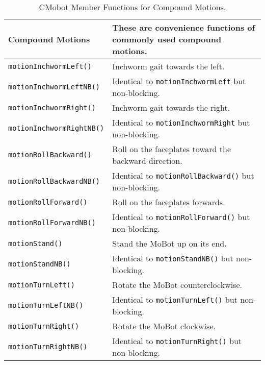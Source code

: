 \begin{table}[!h]
\begin{center}
\caption{CMobot Member Functions for Compound Motions.}
\begin{tabular}{p{38 mm}p{77 mm}}
Compound Motions & These are convenience functions of commonly used compound motions. \\
\hline
\texttt{motionInchwormLeft()} \dotfill & Inchworm gait towards the left. \\
\texttt{motionInchwormLeftNB()} \dotfill & Identical to \texttt{motionInchwormLeft} but non-blocking. \\
\texttt{motionInchwormRight()} \dotfill & Inchworm gait towards the right. \\
\texttt{motionInchwormRightNB()} \dotfill & Identical to \texttt{motionInchwormRight} but non-blocking. \\
\texttt{motionRollBackward()} \dotfill & Roll on the faceplates toward the backward direction. \\
\texttt{motionRollBackwardNB()} \dotfill & Identical to \texttt{motionRollBackward()} but non-blocking. \\
\texttt{motionRollForward()} \dotfill & Roll on the faceplates forwards. \\
\texttt{motionRollForwardNB()} \dotfill & Identical to \texttt{motionRollForward()} but non-blocking. \\
\texttt{motionStand()} \dotfill & Stand the MoBot up on its end. \\
\texttt{motionStandNB()} \dotfill & Identical to \texttt{motionStandNB()} but non-blocking. \\
\texttt{motionTurnLeft()} \dotfill & Rotate the MoBot counterclockwise. \\
\texttt{motionTurnLeftNB()} \dotfill & Identical to \texttt{motionTurnLeft()} but non-blocking. \\
\texttt{motionTurnRight()} \dotfill & Rotate the MoBot clockwise. \\
\texttt{motionTurnRightNB()} \dotfill & Identical to \texttt{motionTurnRight()} but non-blocking. \\
\hline
\end{tabular}
\end{center}
\label{mobilec_api_compound}
\end{table}

